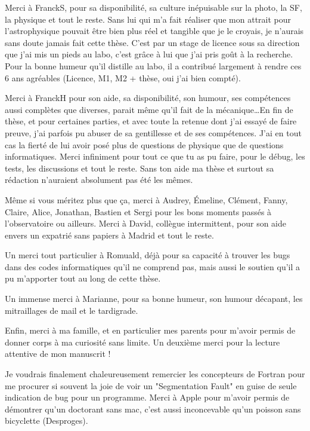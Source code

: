 Merci à FranckS, pour sa disponibilité, sa culture inépuisable sur la photo, la SF, la physique et tout le reste. Sans lui qui
m'a fait réaliser que mon attrait pour l'astrophysique pouvait être bien plus réel et tangible que je le croyais, je n'aurais
sans doute jamais fait cette thèse. C'est par un stage de licence sous sa direction que j'ai mis un pieds au labo, c'est grâce à
lui que j'ai pris goût à la recherche. Pour la bonne humeur qu'il distille au labo, il a contribué largement à rendre ces 6 ans
agréables (Licence, M1, M2 + thèse, oui j'ai bien compté).

Merci à FranckH pour son aide, sa disponibilité, son humour, ses compétences aussi complètes que diverses, parait même qu'il
fait de la mécanique\dots En fin de thèse, et pour certaines parties, et avec toute la retenue dont j'ai essayé de faire preuve,
j'ai parfois pu abuser de sa gentillesse et de ses compétences. J'ai en tout cas la fierté de lui avoir posé plus de questions
de physique que de questions informatiques. Merci infiniment pour tout ce que tu as pu faire, pour le débug, les tests, les
discussions et tout le reste. Sans ton aide ma thèse et surtout sa rédaction n'auraient absolument pas été les mêmes. 

\bigskip

Même si vous méritez plus que ça, merci à Audrey, Émeline, Clément, Fanny, Claire,
Alice, Jonathan, Bastien et
Sergi pour les bons moments passés à l'observatoire ou ailleurs. Merci à David, collègue intermittent, pour son 
aide envers un expatrié sans papiers à Madrid et tout le reste.

Un merci tout particulier à Romuald, déjà pour sa capacité à trouver les bugs dans des codes informatiques qu'il ne comprend
pas, mais aussi le soutien qu'il a pu m'apporter tout au long de cette thèse. 

Un immense merci à Marianne, pour sa bonne humeur, son humour décapant, les mitraillages de mail et le tardigrade. 

Enfin, merci à ma famille, et en particulier mes parents pour m'avoir permis de donner corps à ma curiosité sans limite. Un deuxième merci pour la lecture attentive de mon manuscrit !

Je voudrais finalement chaleureusement remercier les
concepteurs de Fortran pour me procurer si souvent la joie de voir un "Segmentation Fault" en guise de seule indication de bug
pour un programme. Merci à Apple pour m'avoir permis de démontrer qu'un doctorant sans mac, c'est aussi inconcevable qu'un
poisson sans bicyclette (\textcopyright Desproges). 

